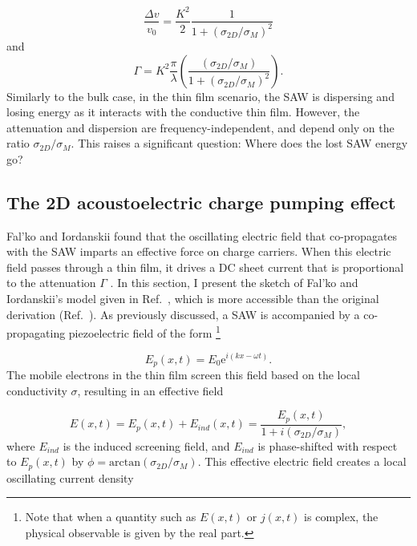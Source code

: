 \documentclass[double,12pt,1in,seploa]{beavtex}
\let\Oldsubsection\subsection
\renewcommand{\subsection}{\FloatBarrier\Oldsubsection}
\begin{document}
\begin{equation}
    \frac{\Delta v}{v_0} = \frac{K^2}{2}\frac{1}{1+(\sigma_{2D}/\sigma_M)^2} \label{v_2D}
\end{equation}
and
\begin{equation}
    \Gamma = K^2 \frac{\pi}{\lambda}\left(\frac{(\sigma_{2D}/\sigma_M)}{1+(\sigma_{2D}/\sigma_M)^2}\right). \label{gamma_2D}
\end{equation}
Similarly to the bulk case, in the thin film scenario, the SAW is dispersing and losing energy as it interacts with the conductive thin film. However, the attenuation and dispersion are frequency-independent, and depend only on the ratio $\sigma_{2D}/\sigma_M$. This raises a significant question: Where does the lost SAW energy go? 


\subsection{The 2D acoustoelectric charge pumping effect} \label{classical relaxtion model}

Fal'ko and Iordanskii found that the oscillating electric field that co-propagates with the SAW imparts an effective force on charge carriers. When this electric field passes through a thin film, it drives a DC sheet current that is proportional to the attenuation $\Gamma$ \cite{falko_acoustoelectric_1993}. In this section, I present the sketch of Fal'ko and Iordanskii's model given in Ref.\ \cite{esslinger_ultrasonic_1994}, which is more accessible than the original derivation (Ref.\ \cite{falko_acoustoelectric_1993}). As previously discussed, a SAW is accompanied by a co-propagating piezoelectric field of the form \footnote{Note that when a quantity such as $E(x,t)$ or $j(x,t)$ is complex, the physical observable is given by the real part.}

\begin{equation}
    E_p(x, t) = E_0 \mathrm{e}^{i(kx - \omega t)}. \label{SAW plane wave}
\end{equation}
The mobile electrons in the thin film screen this field based on the local conductivity $\sigma$, resulting in an effective field

\begin{equation}
    E(x,t) = E_p(x,t) + E_{ind}(x,t) = \frac{E_p(x,t)}{1+i(\sigma_{2D}/\sigma_M)}, \label{E eff}
\end{equation}
where $E_{ind}$ is the induced screening field, and $E_{ind}$ is phase-shifted with respect to $E_p(x,t)$ by $\phi = \mathrm{arctan}(\sigma_{2D}/\sigma_M)$.
This effective electric field creates a local oscillating current density
\end{document}
